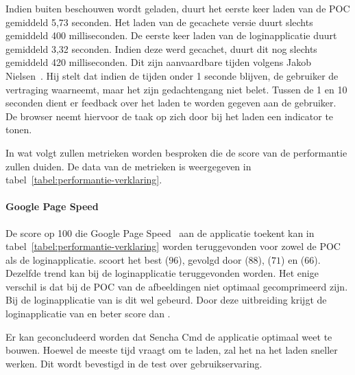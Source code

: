 
Indien \st{} buiten beschouwen wordt geladen, duurt het eerste keer laden van de POC gemiddeld 5,73 seconden. 
Het laden van de gecachete versie duurt slechts gemiddeld 400 milliseconden.
De eerste keer laden van de loginapplicatie duurt gemiddeld 3,32 seconden.
Indien deze werd gecachet, duurt dit nog slechts gemiddeld 420 milliseconden.
Dit zijn aanvaardbare tijden volgens Jakob Nielsen~\cite{Nielsen1993}.
Hij stelt dat indien de tijden onder 1 seconde blijven, de gebruiker de vertraging waarneemt, maar het zijn gedachtengang niet belet.
Tussen de 1 en 10 seconden dient er feedback over het laden te worden gegeven aan de gebruiker.
De browser neemt hiervoor de taak op zich door bij het laden een indicator te tonen.


In wat volgt zullen metrieken worden besproken die de score van de performantie zullen duiden.
De data van de metrieken is weergegeven in tabel~\ref{tabel:performantie-verklaring}.

\paragraph{Google Page Speed}
De score op 100 die Google Page Speed~\cite{Morgan2011} aan de applicatie toekent kan in tabel~\ref{tabel:performantie-verklaring} worden teruggevonden voor zowel de POC als de loginapplicatie.
\st{} scoort het best ($96$),  gevolgd door \lungo{} ($88$),  \jqm{}($71$) en \kendo{}($66$).
Dezelfde trend kan bij de loginapplicatie teruggevonden worden.
Het enige verschil is dat bij de POC van \kendo{} de afbeeldingen niet optimaal gecomprimeerd zijn.
Bij de loginapplicatie van \kendo{} is dit wel gebeurd.
Door deze uitbreiding krijgt de loginapplicatie van \kendo{} en beter score dan \jqm{}.

Er kan geconcludeerd worden dat Sencha Cmd de applicatie optimaal weet te bouwen.
Hoewel \st{} de meeste tijd vraagt om te laden, zal het na het laden sneller werken.
Dit wordt bevestigd in de test over gebruikservaring.

